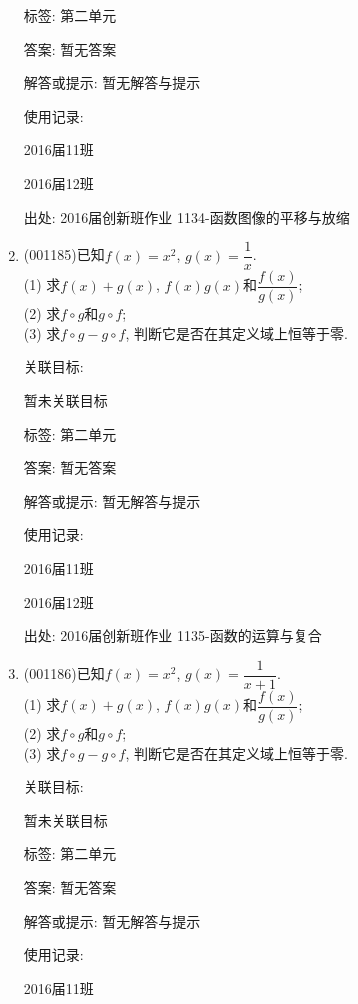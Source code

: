 \documentclass[10pt,a4paper]{article}
\begin{document}
\begin{enumerate}[1.]
标签: 第二单元

答案: 暂无答案

解答或提示: 暂无解答与提示

使用记录:

2016届11班	

2016届12班	


出处: 2016届创新班作业	1134-函数图像的平移与放缩
\item { (001185)}已知$f(x)=x^2$, $g(x)=\dfrac{1}{x}$.\\ 
(1) 求$f(x)+g(x)$, $f(x)g(x)$和$\dfrac{f(x)}{g(x)}$;\\ 
(2) 求$f\circ g$和$g\circ f$;\\ 
(3) 求$f\circ g-g\circ f$, 判断它是否在其定义域上恒等于零.


关联目标:

暂未关联目标



标签: 第二单元

答案: 暂无答案

解答或提示: 暂无解答与提示

使用记录:

2016届11班			

2016届12班			


出处: 2016届创新班作业	1135-函数的运算与复合
\item { (001186)}已知$f(x)=x^2$, $g(x)=\dfrac{1}{x+1}$.\\ 
(1) 求$f(x)+g(x)$, $f(x)g(x)$和$\dfrac{f(x)}{g(x)}$;\\ 
(2) 求$f\circ g$和$g\circ f$;\\ 
(3) 求$f\circ g-g\circ f$, 判断它是否在其定义域上恒等于零.


关联目标:

暂未关联目标



标签: 第二单元

答案: 暂无答案

解答或提示: 暂无解答与提示

使用记录:

2016届11班			


\end{enumerate}
\end{document}
